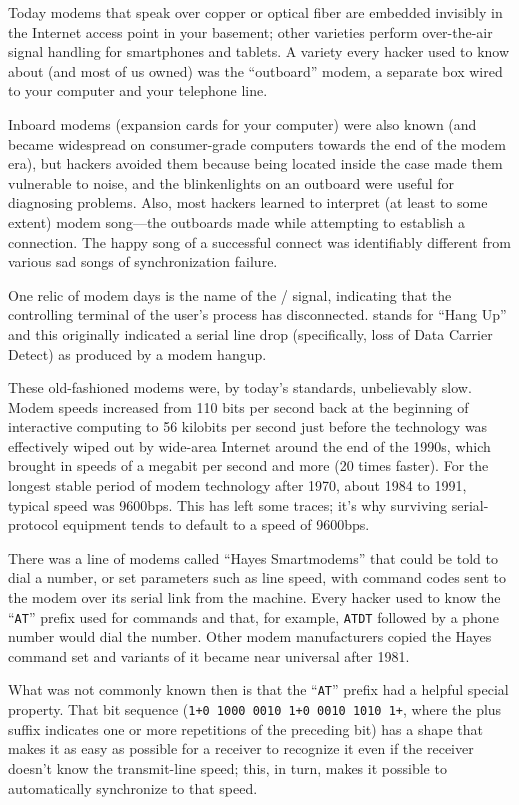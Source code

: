 Today modems that speak over copper or optical fiber are embedded invisibly in
the Internet access point in your basement; other varieties perform
over-the-air signal handling for smartphones and tablets. A variety every
hacker used to know about (and most of us owned) was the ``outboard'' modem, a
separate box wired to your computer and your telephone line.

Inboard modems (expansion cards for your computer) were also known (and became
widespread on consumer-grade computers towards the end of the modem era), but
hackers avoided them because being located inside the case made them vulnerable
to  noise, and the blinkenlights on an outboard were useful for diagnosing
problems. Also, most hackers learned to interpret (at least to some extent)
modem song---the outboards made while attempting to establish a connection. The
happy song of a successful connect was identifiably different from various sad
songs of synchronization failure.

One relic of modem days is the name of the \UNIX/  signal, indicating that
the controlling terminal of the user's process has disconnected.  stands for
``Hang Up'' and this originally indicated a serial line drop (specifically, loss
of Data Carrier Detect) as produced by a modem hangup.

These old-fashioned modems were, by today's standards, unbelievably slow. Modem
speeds increased from 110 bits per second back at the beginning of interactive
computing to 56 kilobits per second just before the technology was effectively
wiped out by wide-area Internet around the end of the 1990s, which brought in
speeds of a megabit per second and more (20 times faster). For the longest
stable period of modem technology after 1970, about 1984 to 1991, typical speed
was 9600bps. This has left some traces; it's why surviving serial-protocol
equipment tends to default to a speed of 9600bps.

There was a line of modems called ``Hayes Smartmodems'' that could be told to
dial a number, or set parameters such as line speed, with command codes sent to
the modem over its serial link from the machine. Every hacker used to know the
``{\tt AT}'' prefix used for commands and that, for example, {\tt ATDT} followed by a phone
number would dial the number. Other modem manufacturers copied the Hayes
command set and variants of it became near universal after 1981.

What was not commonly known then is that the ``{\tt AT}'' prefix had a helpful special
property. That bit sequence ({\tt 1+0 1000 0010 1+0 0010 1010 1+}, where the plus
suffix indicates one or more repetitions of the preceding bit) has a shape that
makes it as easy as possible for a receiver to recognize it even if the
receiver doesn't know the transmit-line speed; this, in turn, makes it possible
to automatically synchronize to that speed.

